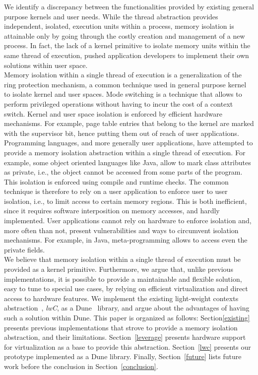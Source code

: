 \documentclass[letterpaper,twocolumn,10pt]{article}
\begin{document}
We identify a discrepancy between the functionalities provided by existing general purpose kernels and user needs.
While the thread abstraction provides independent, isolated, execution units within a process, memory isolation is attainable only by going through the costly creation and management of a new process.
In fact, the lack of a kernel primitive to isolate memory units within the same thread of execution, pushed application developers to implement their own solutions within user space\cite{DBLP:conf/usenix/FordC08,DBLP:journals/cacm/YeeSDCMOONF10,DBLP:conf/uss/SehrMBKPSYC10}. \\

Memory isolation within a single thread of execution is a generalization of the ring protection mechanism, a common technique used in general purpose kernel to isolate kernel and user spaces.
Mode switching is a technique that allows to perform privileged operations without having to incur the cost of a context switch.
Kernel and user space isolation is enforced by efficient hardware mechanisms.
For example, page table entries that belong to the kernel are marked with the supervisor bit, hence putting them out of reach of user applications. \\

Programming languages, and more generally user applications, have attempted to provide a memory isolation abstraction within a single thread of execution.
For example, some object oriented languages like Java, allow to mark class attributes as private, i.e., the object cannot be accessed from some parts of the program.
This isolation is enforced using compile and runtime checks.
The common technique is therefore to rely on a user application to enforce user to user isolation, i.e., to limit access to certain memory regions.
This is both inefficient, since it requires software interposition on memory accesses, and hardly implemented.
User applications cannot rely on hardware to enforce isolation and, more often than not, present vulnerabilities and ways to circumvent isolation mechanisms.
For example, in Java, meta-programming allows to access even the private fields.\\

We believe that memory isolation within a single thread of execution must be provided as a kernel primitive.
Furthermore, we argue that, unlike previous implementations, it is possible to provide a maintainable and flexible solution, easy to tune to special use cases, by relying on efficient virtualization and direct access to hardware features.
We implement the existing light-weight contexts abstraction~\cite{DBLP:conf/osdi/LittonVE0BD16}, \emph{lwC}, as a Dune~\cite{DBLP:conf/osdi/BelayBMTMK12} library, and argue about the advantages of having such a solution within Dune.
This paper is organized as follows: Section\ref{existing} presents previous implementations that strove to provide a memory isolation abstraction, and their limitations.
Section~\ref{leverage} presents hardware support for virtualization as a base to provide this abstraction.
Section~\ref{lwc} presents our prototype implemented as a Dune library.
Finally, Section~\ref{future} lists future work before the conclusion in Section~\ref{conclusion}.
\end{document}
